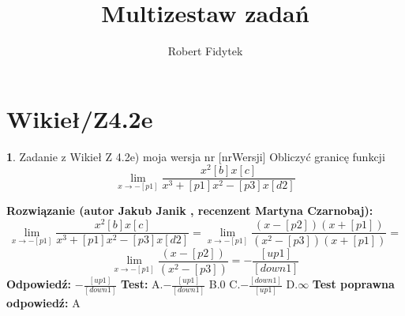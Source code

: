 \documentclass[12pt, a4paper]{article}
\title{Multizestaw zadań}
\author{Robert Fidytek}
\date{}
\theoremstyle{definition} %
\newtheorem{zad}{}
\newcommand{\kategoria}[1]{\section{#1}} %
\newcommand{\zadStart}[1]{\begin{zad}#1\newline} %
\newcommand{\zadStop}{\end{zad}}   %
\newcommand{\rozwStart}[2]{\noindent \textbf{Rozwiązanie (autor #1 , recenzent #2): }\newline} %
\newcommand{\rozwStop}{\newline}                                            %
\newcommand{\odpStart}{\noindent \textbf{Odpowiedź:}\newline}    %
\newcommand{\odpStop}{\newline}                                             %
\newcommand{\testStart}{\noindent \textbf{Test:}\newline} %
\newcommand{\testStop}{\newline} %
\newcommand{\kluczStart}{\noindent \textbf{Test poprawna odpowiedź:}\newline} %
\newcommand{\kluczStop}{\newline} %
\begin{document}
\maketitle


\kategoria{Wikieł/Z4.2e}
\zadStart{Zadanie z Wikieł Z 4.2e) moja wersja nr [nrWersji]}
Obliczyć granicę funkcji $$\lim_{x \to -[p1]} \frac{x^2 [b]x [c]}{x^3 + [p1]x^2 - [p3]x [d2]}$$
\zadStop
\rozwStart{Jakub Janik}{Martyna Czarnobaj}
$$\lim_{x \to -[p1]} \frac{x^2 [b]x [c]}{x^3 + [p1]x^2 - [p3]x [d2]}=\lim_{x \to -[p1]} \frac{(x-[p2])(x+[p1])}{(x^2-[p3])(x+[p1])}=$$
$$\lim_{x \to -[p1]} \frac{(x-[p2])}{(x^2-[p3])}=-\frac{[up1]}{[down1]}$$
\rozwStop
\odpStart
$-\frac{[up1]}{[down1]}$
\odpStop
\testStart
A.$-\frac{[up1]}{[down1]}$
B.$0$
C.$-\frac{[down1]}{[up1]}$
D.$\infty$
\testStop
\kluczStart
A
\kluczStop
\end{document}
